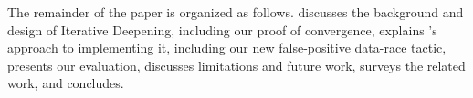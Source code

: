 The remainder of the paper is organized as follows.
\sect{\ref{sec:design}} discusses the background and design of Iterative Deepening, including our proof of convergence,
\sect{\ref{sec:implementation}} explains \quicksand's approach to implementing it, including our new false-positive data-race tactic,
\sect{\ref{sec:eval}} presents our evaluation,
\sect{\ref{sec:future}} discusses limitations and future work,
\sect{\ref{sec:related}} surveys the related work,
and \sect{\ref{sec:conclusion}} concludes.
